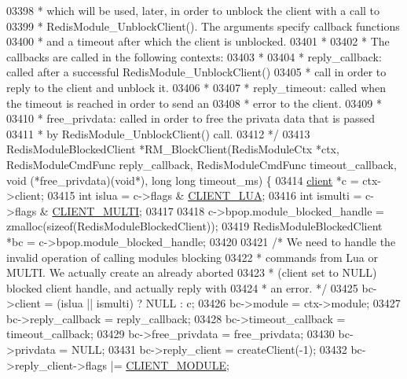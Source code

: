 \begin{DoxyCode}
{{{{{{{{{{03398 \textcolor{comment}{ * which will be used, later, in order to unblock the client with a call to}
03399 \textcolor{comment}{ * RedisModule\_UnblockClient(). The arguments specify callback functions}
03400 \textcolor{comment}{ * and a timeout after which the client is unblocked.}
03401 \textcolor{comment}{ *}
03402 \textcolor{comment}{ * The callbacks are called in the following contexts:}
03403 \textcolor{comment}{ *}
03404 \textcolor{comment}{ *     reply\_callback:  called after a successful RedisModule\_UnblockClient()}
03405 \textcolor{comment}{ *                      call in order to reply to the client and unblock it.}
03406 \textcolor{comment}{ *}
03407 \textcolor{comment}{ *     reply\_timeout:   called when the timeout is reached in order to send an}
03408 \textcolor{comment}{ *                      error to the client.}
03409 \textcolor{comment}{ *}
03410 \textcolor{comment}{ *     free\_privdata:   called in order to free the privata data that is passed}
03411 \textcolor{comment}{ *                      by RedisModule\_UnblockClient() call.}
03412 \textcolor{comment}{ */}
03413 RedisModuleBlockedClient *RM\_BlockClient(RedisModuleCtx *ctx, RedisModuleCmdFunc reply\_callback, 
      RedisModuleCmdFunc timeout\_callback, \textcolor{keywordtype}{void} (*free\_privdata)(\textcolor{keywordtype}{void}*), \textcolor{keywordtype}{long} \textcolor{keywordtype}{long} timeout\_ms) \{
03414     \hyperlink{structclient}{client} *c = ctx->client;
03415     \textcolor{keywordtype}{int} islua = c->flags & \hyperlink{server_8h_af9d0b0f45ef2c1fd29ac714a300de706}{CLIENT\_LUA};
03416     \textcolor{keywordtype}{int} ismulti = c->flags & \hyperlink{server_8h_a7f61f783f429419f8c593291a509b03a}{CLIENT\_MULTI};
03417 
03418     c->bpop.module\_blocked\_handle = zmalloc(\textcolor{keyword}{sizeof}(RedisModuleBlockedClient));
03419     RedisModuleBlockedClient *bc = c->bpop.module\_blocked\_handle;
03420 
03421     \textcolor{comment}{/* We need to handle the invalid operation of calling modules blocking}
03422 \textcolor{comment}{     * commands from Lua or MULTI. We actually create an already aborted}
03423 \textcolor{comment}{     * (client set to NULL) blocked client handle, and actually reply with}
03424 \textcolor{comment}{     * an error. */}
03425     bc->client = (islua || ismulti) ? NULL : c;
03426     bc->module = ctx->module;
03427     bc->reply\_callback = reply\_callback;
03428     bc->timeout\_callback = timeout\_callback;
03429     bc->free\_privdata = free\_privdata;
03430     bc->privdata = NULL;
03431     bc->reply\_client = createClient(-1);
03432     bc->reply\_client->flags |= \hyperlink{server_8h_a633251b1c4bbfe09c54a5c88920d8eda}{CLIENT\_MODULE};
}}}}}}}}}}
\end{DoxyCode}

